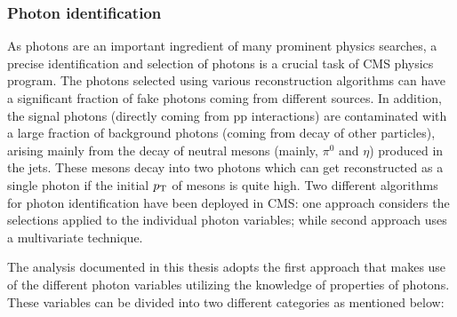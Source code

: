 \subsubsection{Photon identification}\label{Se:Ph_identi}
As photons are an important ingredient of many prominent physics searches, a precise identification and selection of photons is a crucial task of CMS physics
program. The photons selected using various reconstruction algorithms can have a significant fraction of fake photons coming from different sources.
In addition, the signal photons (directly coming from pp interactions) are contaminated with a large fraction of background photons (coming
from decay of other particles), arising mainly from the decay of neutral mesons (mainly, $\pi^{0}$ and $\eta$)
produced in the jets. These mesons decay into two photons which can get reconstructed as a single photon if the initial $p_{\mathrm T}$ of mesons is quite high.
Two different algorithms for photon identification have been deployed in CMS: one approach considers the selections applied to the individual photon variables;
while second approach uses a multivariate technique.

The analysis documented in this thesis adopts the first approach that makes use of the different photon variables utilizing the knowledge of properties of photons.
These variables can be divided into two different categories as mentioned below:
